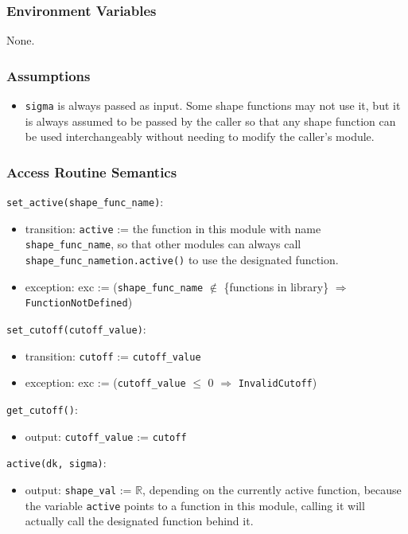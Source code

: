 \documentclass[12pt, titlepage]{article}
\begin{document}
\subsubsection{Environment Variables}
None.

\subsubsection{Assumptions}
\begin{itemize}
  \item \texttt{sigma} is always passed as input. Some shape functions may not use it, but it is always assumed to be passed by the caller so that any shape function can be used interchangeably without needing to modify the caller's module.
\end{itemize}

\subsubsection{Access Routine Semantics}

\noindent \texttt{set\_active(shape\_func\_name)}:
\begin{itemize}
\item transition: \texttt{active} := the function in this module with name \texttt{shape\_func\_name},
\newline so that other modules can always call \texttt{shape\_func\_nametion.active()} to use the designated function.
\item exception: exc := (\texttt{shape\_func\_name} $\notin$ \{functions in library\} $\Rightarrow$ \texttt{FunctionNotDefined})
\end{itemize}

\noindent \texttt{set\_cutoff(cutoff\_value)}:
\begin{itemize}
\item transition: \texttt{cutoff} := \texttt{cutoff\_value}
\item exception: exc := (\texttt{cutoff\_value} $\le$ 0 $\Rightarrow$ \texttt{InvalidCutoff})
\end{itemize}

\noindent \texttt{get\_cutoff()}:
\begin{itemize}
\item output: \texttt{cutoff\_value} := \texttt{cutoff}
\end{itemize}

\noindent \texttt{active(dk, sigma)}:
\begin{itemize}
  \item output: \texttt{shape\_val} := $\mathbb{R}$, depending on the currently active function, 
  \newline because the variable \texttt{active} points to a function in this module, calling it will actually call the designated function behind it.
\end{itemize}
\end{document}
